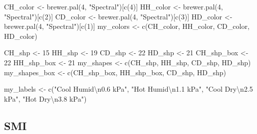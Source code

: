 \documentclass[
]{article}
\newenvironment{Shaded}{\begin{snugshade}}{\end{snugshade}}
\newcommand{\DecValTok}[1]{\textcolor[rgb]{0.00,0.00,0.81}{#1}}
\newcommand{\FunctionTok}[1]{\textcolor[rgb]{0.00,0.00,0.00}{#1}}
\newcommand{\NormalTok}[1]{#1}
\newcommand{\OtherTok}[1]{\textcolor[rgb]{0.56,0.35,0.01}{#1}}
\newcommand{\SpecialCharTok}[1]{\textcolor[rgb]{0.00,0.00,0.00}{#1}}
\newcommand{\StringTok}[1]{\textcolor[rgb]{0.31,0.60,0.02}{#1}}
\begin{document}
\begin{Shaded}
\begin{Highlighting}[]
\NormalTok{CH\_color }\OtherTok{\textless{}{-}} \FunctionTok{brewer.pal}\NormalTok{(}\DecValTok{4}\NormalTok{, }\StringTok{"Spectral"}\NormalTok{)[}\FunctionTok{c}\NormalTok{(}\DecValTok{4}\NormalTok{)]}
\NormalTok{HH\_color }\OtherTok{\textless{}{-}} \FunctionTok{brewer.pal}\NormalTok{(}\DecValTok{4}\NormalTok{, }\StringTok{"Spectral"}\NormalTok{)[}\FunctionTok{c}\NormalTok{(}\DecValTok{2}\NormalTok{)]}
\NormalTok{CD\_color }\OtherTok{\textless{}{-}} \FunctionTok{brewer.pal}\NormalTok{(}\DecValTok{4}\NormalTok{, }\StringTok{"Spectral"}\NormalTok{)[}\FunctionTok{c}\NormalTok{(}\DecValTok{3}\NormalTok{)]}
\NormalTok{HD\_color }\OtherTok{\textless{}{-}} \FunctionTok{brewer.pal}\NormalTok{(}\DecValTok{4}\NormalTok{, }\StringTok{"Spectral"}\NormalTok{)[}\FunctionTok{c}\NormalTok{(}\DecValTok{1}\NormalTok{)]}
\NormalTok{my\_colors }\OtherTok{\textless{}{-}} \FunctionTok{c}\NormalTok{(CH\_color, HH\_color, CD\_color, HD\_color)}

\NormalTok{CH\_shp }\OtherTok{\textless{}{-}} \DecValTok{15}
\NormalTok{HH\_shp }\OtherTok{\textless{}{-}} \DecValTok{19}
\NormalTok{CD\_shp }\OtherTok{\textless{}{-}} \DecValTok{22}
\NormalTok{HD\_shp }\OtherTok{\textless{}{-}} \DecValTok{21}
\NormalTok{CH\_shp\_box }\OtherTok{\textless{}{-}} \DecValTok{22}
\NormalTok{HH\_shp\_box }\OtherTok{\textless{}{-}} \DecValTok{21}
\NormalTok{my\_shapes }\OtherTok{\textless{}{-}} \FunctionTok{c}\NormalTok{(CH\_shp, HH\_shp, CD\_shp, HD\_shp)}
\NormalTok{my\_shapes\_box }\OtherTok{\textless{}{-}} \FunctionTok{c}\NormalTok{(CH\_shp\_box, HH\_shp\_box, CD\_shp, HD\_shp)}

\NormalTok{my\_labels }\OtherTok{\textless{}{-}} \FunctionTok{c}\NormalTok{(}\StringTok{"Cool Humid}\SpecialCharTok{\textbackslash{}n}\StringTok{0.6 kPa"}\NormalTok{,}
                               \StringTok{"Hot Humid}\SpecialCharTok{\textbackslash{}n}\StringTok{1.1 kPa"}\NormalTok{,}
                               \StringTok{"Cool Dry}\SpecialCharTok{\textbackslash{}n}\StringTok{2.5 kPa"}\NormalTok{,}
                               \StringTok{"Hot Dry}\SpecialCharTok{\textbackslash{}n}\StringTok{3.8 kPa"}\NormalTok{)}
\end{Highlighting}
\end{Shaded}

\hypertarget{smi-1}{%
\subsection{SMI}\label{smi-1}}
\end{document}
